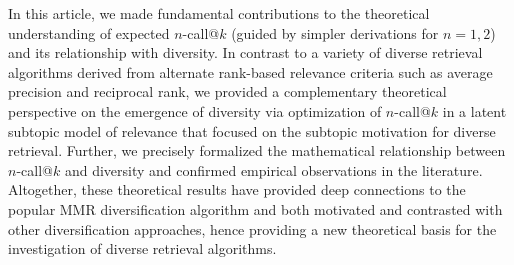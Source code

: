 In this article, we made fundamental contributions to the theoretical
understanding of expected $n$-call@$k$ (guided by simpler 
derivations for $n=1,2$) and its relationship with
diversity.  In contrast to a variety of diverse retrieval algorithms
derived from alternate rank-based relevance criteria such as average
precision and reciprocal rank, we provided a complementary theoretical
perspective on the emergence of diversity via optimization of
$n$-call@$k$ in a latent subtopic model of relevance that focused on
the subtopic motivation for diverse retrieval.  Further, we
precisely formalized the mathematical relationship between
$n$-call@$k$ and diversity and confirmed empirical observations in the
literature.  Altogether, these theoretical results have provided deep
connections to the popular MMR diversification algorithm and both
motivated and contrasted with other diversification
approaches, hence providing a new theoretical basis for the
investigation of diverse retrieval algorithms.


\appendix
